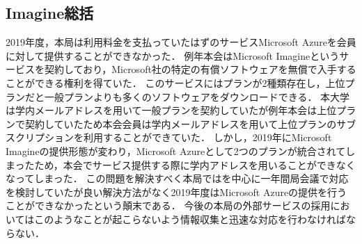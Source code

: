 \subsection*{Imagine総括}

2019年度，本局は利用料金を支払っていたはずのサービスMicrosoft Azureを会員に対して提供することができなかった．
例年本会はMicrosoft Imagineというサービスを契約しており，Microsoft社の特定の有償ソフトウェアを無償で入手することができる権利を得ていた．
このサービスにはプランが2種類存在し，上位プランだと一般プランよりも多くのソフトウェアをダウンロードできる．
本大学は学内メールアドレスを用いて一般プランを契約していたが例年本会は上位プランで契約していたため本会会員は学内メールアドレスを用いて上位プランのサブスクリプションを利用することができていた．
しかし，2019年にMicrosoft Imagineの提供形態が変わり，Microsoft Azureとして2つのプランが統合されてしまったため，本会でサービス提供する際に学内アドレスを用いることができなくなってしまった．
この問題を解決すべく本局では\thirdGrade{}を中心に一年間局会議で対応を検討していたが良い解決方法がなく2019年度はMicrosoft Azureの提供を行うことができなかったという顛末である．
今後の本局の外部サービスの採用においてはこのようなことが起こらないよう情報収集と迅速な対応を行わなければならない．